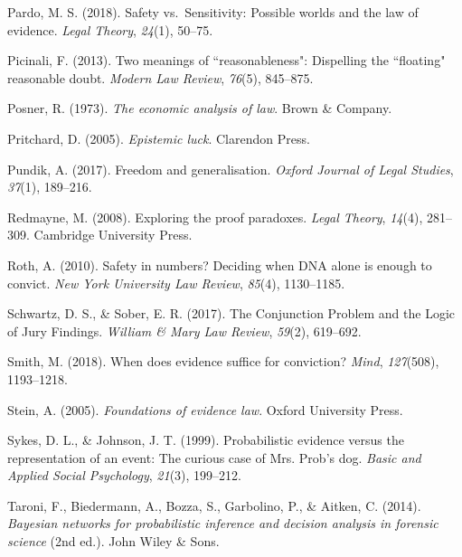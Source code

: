 \documentclass[10pt,dvipsnames,enabledeprecatedfontcommands]{scrartcl}
\begin{document}
\leavevmode\hypertarget{ref-pardo2018}{}%
Pardo, M. S. (2018). Safety vs.~Sensitivity: Possible worlds and the law
of evidence. \emph{Legal Theory}, \emph{24}(1), 50--75.

\leavevmode\hypertarget{ref-picinali2013}{}%
Picinali, F. (2013). Two meanings of ``reasonableness": Dispelling the
``floating" reasonable doubt. \emph{Modern Law Review}, \emph{76}(5),
845--875.

\leavevmode\hypertarget{ref-Posner1973}{}%
Posner, R. (1973). \emph{The economic analysis of law}. Brown \&
Company.

\leavevmode\hypertarget{ref-pritchard2005epistemic}{}%
Pritchard, D. (2005). \emph{Epistemic luck}. Clarendon Press.

\leavevmode\hypertarget{ref-pundik2017}{}%
Pundik, A. (2017). Freedom and generalisation. \emph{Oxford Journal of
Legal Studies}, \emph{37}(1), 189--216.

\leavevmode\hypertarget{ref-redmayne2008exploring}{}%
Redmayne, M. (2008). Exploring the proof paradoxes. \emph{Legal Theory},
\emph{14}(4), 281--309. Cambridge University Press.

\leavevmode\hypertarget{ref-Roth2010}{}%
Roth, A. (2010). Safety in numbers? Deciding when DNA alone is enough to
convict. \emph{New York University Law Review}, \emph{85}(4),
1130--1185.

\leavevmode\hypertarget{ref-schwartz2017ConjunctionProblemLogic}{}%
Schwartz, D. S., \& Sober, E. R. (2017). The Conjunction Problem and the
Logic of Jury Findings. \emph{William \& Mary Law Review}, \emph{59}(2),
619--692.

\leavevmode\hypertarget{ref-smith2017}{}%
Smith, M. (2018). When does evidence suffice for conviction?
\emph{Mind}, \emph{127}(508), 1193--1218.

\leavevmode\hypertarget{ref-Stein05}{}%
Stein, A. (2005). \emph{Foundations of evidence law}. Oxford University
Press.

\leavevmode\hypertarget{ref-sykes1999}{}%
Sykes, D. L., \& Johnson, J. T. (1999). Probabilistic evidence versus
the representation of an event: The curious case of Mrs. Prob's dog.
\emph{Basic and Applied Social Psychology}, \emph{21}(3), 199--212.

\leavevmode\hypertarget{ref-taroni2006bayesian}{}%
Taroni, F., Biedermann, A., Bozza, S., Garbolino, P., \& Aitken, C.
(2014). \emph{Bayesian networks for probabilistic inference and decision
analysis in forensic science} (2nd ed.). John Wiley \& Sons.
\end{document}
